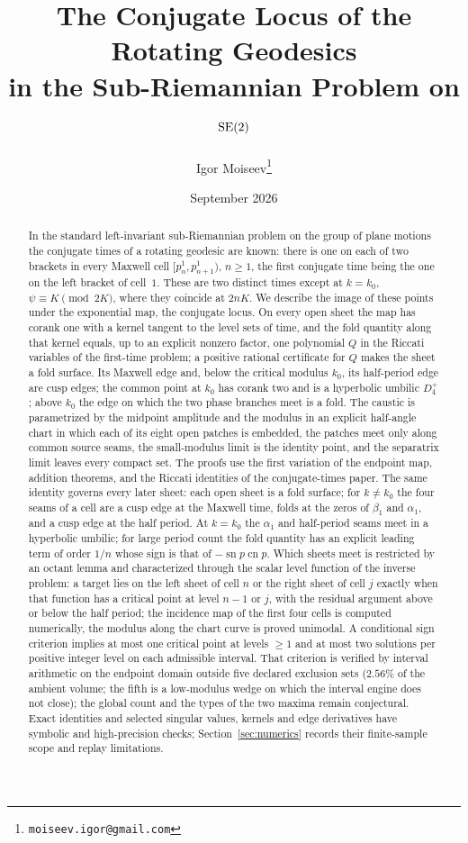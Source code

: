 \documentclass[11pt]{article}
\title{The Conjugate Locus of the Rotating Geodesics\\
in the Sub-Riemannian Problem on $\operatorname{SE}(2)$}
\author{Igor Moiseev\thanks{\texttt{moiseev.igor@gmail.com}}}
\date{September 2026}
\theoremstyle{remark}
\newcommand{\sn}{\operatorname{sn}}
\newcommand{\cn}{\operatorname{cn}}
\begin{document}
\setlength{\emergencystretch}{2em}
\maketitle

\begin{abstract}
In the standard left-invariant sub-Riemannian problem on the group of plane
motions the conjugate times of a rotating geodesic are known: there is
one on each of two brackets in every Maxwell cell
$[p_n^1,p_{n+1}^1)$, $n\ge1$, the first conjugate time being the one on
the left bracket of cell~$1$.  These are two distinct times except at
$k=k_0$, $\psi\equiv K\pmod{2K}$, where they coincide at $2nK$.  We describe the image
of these points under the exponential map, the conjugate locus.  On every
open sheet the map has corank one with a kernel tangent to the level
sets of time, and the fold quantity along that kernel equals, up to an
explicit nonzero factor, one polynomial $Q$ in the Riccati variables of
the first-time problem; a positive rational certificate for $Q$ makes the
sheet a fold surface.  Its Maxwell edge and, below the critical modulus
$k_0$, its half-period edge are cusp edges; the common point at $k_0$ has
corank two and is a hyperbolic umbilic $D_4^+$; above $k_0$ the edge on
which the two phase branches meet is a fold.  The caustic is parametrized
by the midpoint amplitude and the modulus in an explicit half-angle chart
in which each of its eight open patches is embedded, the patches meet only
along common source seams, the small-modulus limit is the identity point,
and the separatrix limit leaves every compact set.  The proofs use the first
variation of the endpoint map, addition theorems, and the Riccati
identities of the conjugate-times paper.  The same identity governs every
later sheet: each open sheet is a fold surface; for $k\ne k_0$ the four
seams of a cell are a cusp edge at the Maxwell time, folds at the zeros
of $\beta_1$ and $\alpha_1$, and a cusp edge at the half period.  At
$k=k_0$ the $\alpha_1$ and half-period seams meet in a hyperbolic umbilic;
for large period count the fold quantity has an
explicit leading term of order $1/n$ whose sign is that of
$-\sn p\cn p$.  Which sheets meet is restricted by an octant lemma and
characterized through the scalar level function of the inverse problem:
a target lies on the left sheet of cell $n$ or the right sheet of cell
$j$ exactly when that function has a critical point at level $n-1$ or
$j$, with the residual argument above or below the half period; the
incidence map of the first four cells is computed numerically, the
modulus along the chart curve is proved unimodal.  A conditional sign criterion
implies at most one critical point at levels $\ge1$ and at most two
solutions per positive integer level on each admissible interval.
That criterion is verified by interval arithmetic on the endpoint domain
outside five declared exclusion sets ($2.56\%$ of the ambient volume;
the fifth is a low-modulus wedge on which the interval engine does not
close); the global count and
the types of the two maxima remain conjectural.  Exact identities and
selected singular values, kernels and edge derivatives have symbolic
and high-precision checks; Section~\ref{sec:numerics} records their
finite-sample scope and replay limitations.
\end{abstract}
\end{document}
